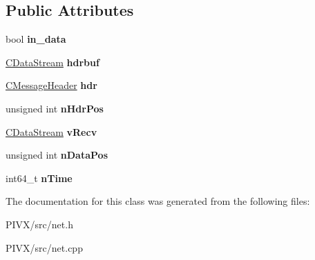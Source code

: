 \subsection*{Public Attributes}
\begin{DoxyCompactItemize}
\item 
\mbox{\label{class_c_net_message_a8f399ad7225f980bdab3ede17b1b23af}} 
bool {\bfseries in\+\_\+data}
\item 
\mbox{\label{class_c_net_message_a80a6f95f0c187aa97788118248cbf452}} 
\mbox{\hyperlink{class_c_data_stream}{C\+Data\+Stream}} {\bfseries hdrbuf}
\item 
\mbox{\label{class_c_net_message_ae7215dca62862a3688f7eeb94646c377}} 
\mbox{\hyperlink{class_c_message_header}{C\+Message\+Header}} {\bfseries hdr}
\item 
\mbox{\label{class_c_net_message_a1a500121037490eec4b238906f3a23ad}} 
unsigned int {\bfseries n\+Hdr\+Pos}
\item 
\mbox{\label{class_c_net_message_a1a25c16099d01362e1663390a2e06d1a}} 
\mbox{\hyperlink{class_c_data_stream}{C\+Data\+Stream}} {\bfseries v\+Recv}
\item 
\mbox{\label{class_c_net_message_a418f59287d1805dda6959f27a170c855}} 
unsigned int {\bfseries n\+Data\+Pos}
\item 
\mbox{\label{class_c_net_message_a99d5bbca862ac4b7a88b71a7b679decc}} 
int64\+\_\+t {\bfseries n\+Time}
\end{DoxyCompactItemize}


The documentation for this class was generated from the following files\+:\begin{DoxyCompactItemize}
\item 
P\+I\+V\+X/src/net.\+h\item 
P\+I\+V\+X/src/net.\+cpp\end{DoxyCompactItemize}
